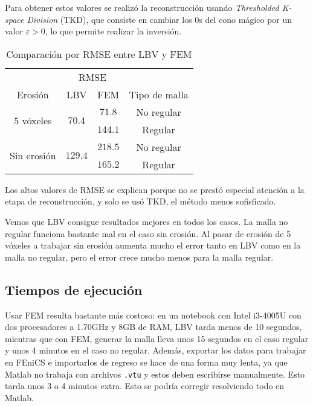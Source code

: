 Para obtener estos valores se realizó la reconstrucción usando \textit{Thresholded K-space Division} (TKD), que consiste en cambiar los $0$s del cono mágico por un valor $\varepsilon > 0$, lo que permite realizar la inversión.

\begin{table}[h!]
\centering
\begin{tabular}{|c|c|c|c|}
\hline
 & \multicolumn{2}{|c|}{RMSE} &\\
\cline{2-3}
Erosión & LBV & FEM & Tipo de malla \\
\hline
\hline
\multirow{2}{5em}{5 vóxeles} & \multirow{2}{3em}{$70.4$} & $71.8$ & No regular\\
\cline{3-4}
& & $144.1$ & Regular \\
\hline
\hline
\multirow{2}{5em}{Sin erosión} & \multirow{2}{3em}{$129.4$} & $218.5$ & No regular\\
\cline{3-4}
& & $165.2$ & Regular\\
\hline
\end{tabular}
\caption{Comparación por RMSE entre LBV y FEM}
\label{table:rmse}
\end{table}


Los altos valores de RMSE se explican porque no se prestó especial atención a la etapa de reconstrucción, y solo se usó TKD, el método menos sofisficado.

Vemos que LBV consigue resultados mejores en todos los casos. La malla no regular funciona bastante mal en el caso sin erosión. Al pasar de erosión de 5 vóxeles a trabajar sin erosión aumenta mucho el error tanto en LBV como en la malla no regular, pero el error crece mucho menos para la malla regular.
  
\subsection{Tiempos de ejecución}

Usar FEM resulta bastante más costoso: en un notebook con Intel i3-4005U con dos procesadores a 1.70GHz y 8GB de RAM, LBV tarda menos de 10 segundos, mientras que con FEM, generar la malla lleva unos 15 segundos en el caso regular y unos 4 minutos en el caso no regular. Además, exportar los datos para trabajar en FEniCS e importarlos de regreso se hace de una forma muy lenta, ya que Matlab no trabaja con archivos \texttt{.vtu} y estos deben escribirse manualmente. Esto tarda unos 3 o 4 minutos extra. Esto se podría corregir resolviendo todo en Matlab.


